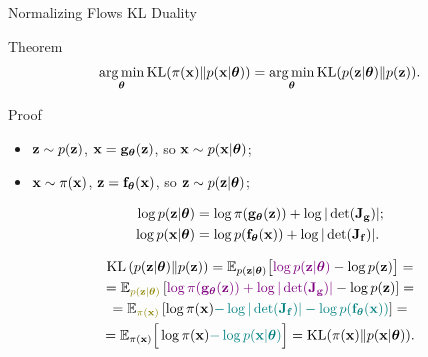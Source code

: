 \documentclass{beamer}
\begin{document}
\begin{frame}{Normalizing Flows KL Duality}
	\begin{block}{Theorem}
		\vspace{-0.3cm}
		\[
			\operatorname*{arg\,min}_{\boldsymbol{\theta}} \mathrm{KL}(\pi(\mathbf{x}) \| p(\mathbf{x} | \boldsymbol{\theta})) = \operatorname*{arg\,min}_{\boldsymbol{\theta}} \mathrm{KL}(p(\mathbf{z} | \boldsymbol{\theta}) \| p(\mathbf{z})).
		\]
		\vspace{-0.7cm}
	\end{block}
	\begin{block}{Proof}
		\begin{itemize}
			\item $\mathbf{z} \sim p(\mathbf{z})$, $\mathbf{x} = \mathbf{g}_{\boldsymbol{\theta}}(\mathbf{z})$, so $\mathbf{x} \sim p(\mathbf{x}| \boldsymbol{\theta})$;
			\item $\mathbf{x} \sim \pi(\mathbf{x})$, $\mathbf{z} = \mathbf{f}_{\boldsymbol{\theta}}(\mathbf{x})$, so $\mathbf{z} \sim p(\mathbf{z} | \boldsymbol{\theta})$;
		\end{itemize}
        
		\vspace{-0.3cm}
		\begin{align*}
			\log p(\mathbf{z} | \boldsymbol{\theta}) &= \log \pi(\mathbf{g}_{\boldsymbol{\theta}}(\mathbf{z})) + \log | \det ( \mathbf{J}_{\mathbf{g}}) |; \\
			\log p(\mathbf{x} | \boldsymbol{\theta}) &= \log p(\mathbf{f}_{\boldsymbol{\theta}}(\mathbf{x})) + \log | \det ( \mathbf{J}_{\mathbf{f}}) |.
		\end{align*}
        
		\vspace{-1.0cm}
		\begin{multline*}
			\KL\left(p(\bz | \btheta) \| p(\bz) \right) = \bbE_{p(\bz | \btheta)} \bigl[ {\color{violet}\log p(\bz | \btheta)} - \log p(\bz) \bigr]
			 = \\ = \bbE_{{\color{olive}p(\bz | \btheta)}} \left[ {\color{violet}\log \pi(\bg_{\btheta}(\bz)) +  \log |\det (\bJ_\bg)|} - \log p(\bz) \right]
			 = \\ = \bbE_{{\color{olive}\pi(\bx)}} \left[ \log \pi(\bx) {\color{teal} - \log |\det (\bJ_\bff)| - \log p(\bff_{\btheta}(\bx))} \right]
			 = \\ = \bbE_{\pi(\bx)} \Big[ \log \pi(\bx) {\color{teal} -\log p(\bx | \btheta)} \Big] = \KL (\pi(\bx) \| p(\bx | \btheta)).
		\end{multline*}
	\end{block}
\end{frame}
\end{document}

